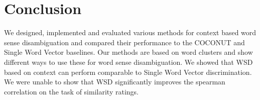 \documentclass[11pt]{article}
\begin{document}
\section{Conclusion}
We designed, implemented and evaluated various methods for context based word sense disambiguation and compared their performance to the COCONUT and Single Word Vector baselines. Our methods are based on word clusters and show different ways to use these for word sense disambiguation. We showed that WSD based on context can perform comparable to Single Word Vector discrimination. We were unable to show that WSD significantly improves the spearman correlation on the task of similarity ratings. 



\end{document}
